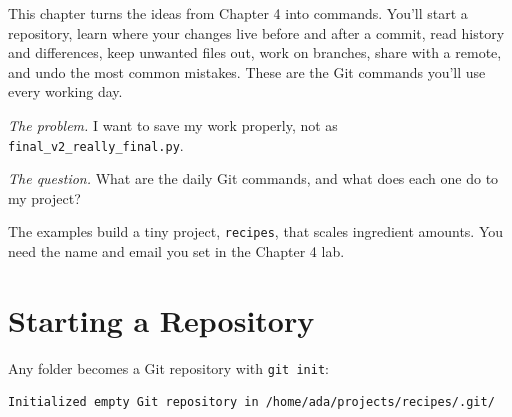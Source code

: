 
\begin{chapterintro}

This chapter turns the ideas from Chapter 4 into commands. You'll start a repository, learn where your changes live before and after a commit, read history and differences, keep unwanted files out, work on branches, share with a remote, and undo the most common mistakes. These are the Git commands you'll use every working day.

\end{chapterintro}

\emph{The problem.} I want to save my work properly, not as \texttt{final\_}\allowbreak{}\texttt{v2\_}\allowbreak{}\texttt{really\_}\allowbreak{}\texttt{final.}\allowbreak{}\texttt{py}.

\emph{The question.} What are the daily Git commands, and what does each one do to my project?

The examples build a tiny project, \texttt{recipes}, that scales ingredient amounts. You need the name and email you set in the Chapter 4 lab.


\section{Starting a Repository}\label{08-git-every-day:starting-a-repository}

Any folder becomes a Git repository with \texttt{git\ init}:

\begin{codeblock}

\begin{Shaded}
\begin{Highlighting}[]
 
\end{Highlighting}
\end{Shaded}

\end{codeblock}

\begin{codeblock}
\begin{Verbatim}[formatcom=\outputstyle]
Initialized empty Git repository in /home/ada/projects/recipes/.git/
\end{Verbatim}
\end{codeblock}

